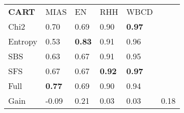 \begin{tabular}{|l|l|l|l|l|l}
\cline{1-5}
        \textbf{CART} & MIAS              & EN                & RHH               & WBCD      &         \\
\cline{1-5}
Chi2    & 0.70           & 0.69           & 0.90           & \textbf{0.97}  &         \\
Entropy & 0.53           & \textbf{0.83}  & 0.91           & 0.96           &         \\
SBS     & 0.63           & 0.67           & 0.91           & 0.95           &         \\
SFS     & 0.67           & 0.67           & \textbf{0.92}  & \textbf{0.97}  &         \\
Full    & \textbf{0.77}  & 0.69           & 0.90           & 0.94           &         \\
\cline{1-5}
\cline{1-5}
Gain    & -0.09           & 0.21           & 0.03           & 0.03           & 0.18 \\
\cline{1-5}
\end{tabular}
